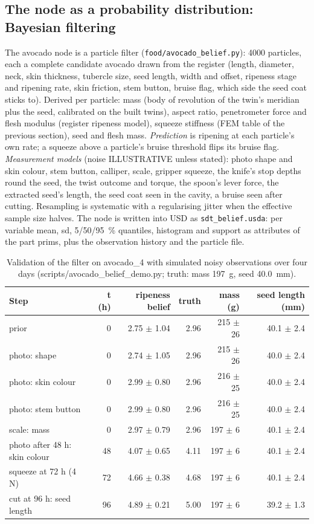 \documentclass[10.5pt,a4paper]{article}
\begin{document}
\subsection{The node as a probability distribution: Bayesian filtering}
The avocado node is a particle filter (\texttt{food/avocado\_belief.py}): 4000 particles, each a complete candidate
avocado drawn from the register (length, diameter, neck, skin thickness, tubercle size, seed length, width and
offset, ripeness stage and ripening rate, skin friction, stem button, bruise flag, which side the seed coat sticks
to). Derived per particle: mass (body of revolution of the twin's meridian plus the seed, calibrated on the built
twins), aspect ratio, penetrometer force and flesh modulus (register ripeness model), squeeze stiffness (FEM table of
the previous section), seed and flesh mass. \emph{Prediction} is ripening at each particle's own rate; a squeeze
above a particle's bruise threshold flips its bruise flag. \emph{Measurement models} (noise ILLUSTRATIVE unless
stated): photo shape and skin colour, stem button, calliper, scale, gripper squeeze, the knife's stop depths round the
seed, the twist outcome and torque, the spoon's lever force, the extracted seed's length, the seed coat seen in the
cavity, a bruise seen after cutting. Resampling is systematic with a regularising jitter when the effective sample
size halves. The node is written into USD as \texttt{sdt\_belief.usda}: per variable mean, sd, 5/50/95~\% quantiles,
histogram and support as attributes of the part prims, plus the observation history and the particle file.
\begin{table}[htbp]\centering\scriptsize\caption{Validation of the filter on avocado\_4 with simulated noisy observations over four days (scripts/avocado\_belief\_demo.py; truth: mass 197~g, seed 40.0~mm).}
\begin{tabularx}{\linewidth}{@{}Xrrrrr@{}}\toprule Step & t (h) & ripeness belief & truth & mass (g) & seed length (mm) \\\midrule
prior & 0 & 2.75 $\pm$ 1.04 & 2.96 & 215 $\pm$ 26 & 40.1 $\pm$ 2.4 \\
photo: shape & 0 & 2.74 $\pm$ 1.05 & 2.96 & 215 $\pm$ 26 & 40.0 $\pm$ 2.4 \\
photo: skin colour & 0 & 2.99 $\pm$ 0.80 & 2.96 & 216 $\pm$ 25 & 40.0 $\pm$ 2.4 \\
photo: stem button & 0 & 2.99 $\pm$ 0.80 & 2.96 & 216 $\pm$ 25 & 40.0 $\pm$ 2.4 \\
scale: mass & 0 & 2.97 $\pm$ 0.79 & 2.96 & 197 $\pm$ 6 & 40.1 $\pm$ 2.4 \\
photo after 48 h: skin colour & 48 & 4.07 $\pm$ 0.65 & 4.11 & 197 $\pm$ 6 & 40.1 $\pm$ 2.4 \\
squeeze at 72 h (4 N) & 72 & 4.66 $\pm$ 0.38 & 4.68 & 197 $\pm$ 6 & 40.1 $\pm$ 2.4 \\
cut at 96 h: seed length & 96 & 4.89 $\pm$ 0.21 & 5.00 & 197 $\pm$ 6 & 39.2 $\pm$ 1.3 \\\bottomrule\end{tabularx}\end{table}
\end{document}
